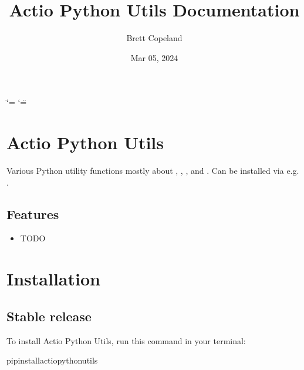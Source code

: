 \documentclass[letterpaper,10pt,english]{sphinxmanual}
\title{Actio Python Utils Documentation}
\date{Mar 05, 2024}
\author{Brett Copeland}
\begin{document}
\ifdefined\shorthandoff
  \ifnum\catcode`\=\string=\active\shorthandoff{=}\fi
  \ifnum\catcode`\"=\active{}\fi
\fi

\pagestyle{empty}
\sphinxmaketitle
\pagestyle{plain}
\sphinxtableofcontents
\pagestyle{normal}
\label{\detokenize{index::doc}}


\sphinxstepscope


\chapter{Actio Python Utils}
\label{\detokenize{readme:actio-python-utils}}\label{\detokenize{readme::doc}}
\sphinxAtStartPar
Various Python utility functions mostly about , , , and .
Can be installed via  e.g. .


\section{Features}
\label{\detokenize{readme:features}}\begin{itemize}
\item {} 
\sphinxAtStartPar
TODO

\end{itemize}

\sphinxstepscope


\chapter{Installation}
\label{\detokenize{installation:installation}}\label{\detokenize{installation::doc}}

\section{Stable release}
\label{\detokenize{installation:stable-release}}
\sphinxAtStartPar
To install Actio Python Utils, run this command in your terminal:

\begin{sphinxVerbatim}[commandchars=\\\{\}]
pipinstallactio\PYGZus{}python\PYGZus{}utils
\end{sphinxVerbatim}
\end{document}
